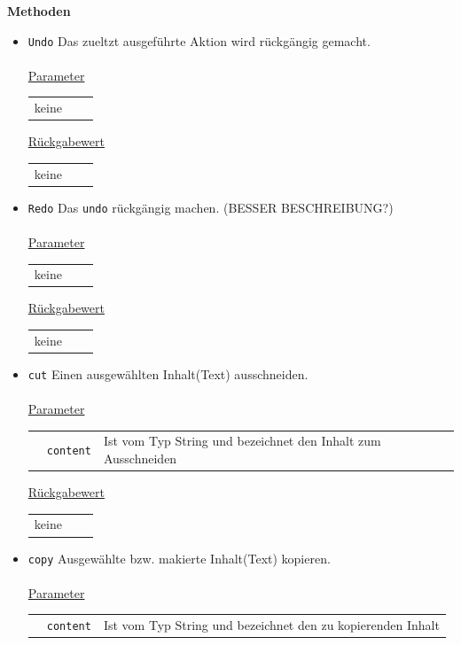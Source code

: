 \documentclass{article}
\begin{document}
\textbf{{Methoden}}
\begin{itemize}
\item \texttt{Undo} \newline Das zueltzt ausgeführte Aktion wird rückgängig gemacht.
\\\\
\underline{{Parameter}} 
\begin{tabular}{lll}
 keine
\end{tabular}

\underline{{Rückgabewert}}
\begin{tabular}{lll}
 keine
\end{tabular}

\item \texttt{Redo} \newline Das \texttt{undo} rückgängig machen. (BESSER BESCHREIBUNG?)
\\\\
\underline{{Parameter}} 
\begin{tabular}{lll}
 keine
\end{tabular}

\underline{{Rückgabewert}}
\begin{tabular}{lll}
keine
\end{tabular}

\item \texttt{cut} \newline Einen ausgewählten Inhalt(Text) ausschneiden.
\\\\
\underline{{Parameter}} 
\begin{tabular}{lll}
 & \texttt{content} & Ist vom Typ String und bezeichnet den Inhalt zum Ausschneiden\\
\end{tabular}

\underline{{Rückgabewert}}
\begin{tabular}{lll}
keine
\end{tabular}

\item \texttt{copy} \newline Ausgewählte bzw. makierte Inhalt(Text) kopieren.
\\\\
\underline{{Parameter}} 
\begin{tabular}{lll}
& \texttt{content} & Ist vom Typ String und bezeichnet den zu kopierenden Inhalt \\
\end{tabular}


\end{itemize}
\end{document}
